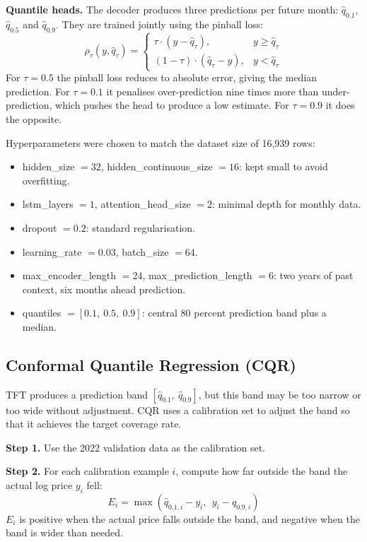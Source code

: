 \documentclass[conference,twoside]{IEEEtran}
\begin{document}
\textbf{Quantile heads.} The decoder produces three predictions per future month: $\hat{q}_{0.1}$, $\hat{q}_{0.5}$ and $\hat{q}_{0.9}$. They are trained jointly using the pinball loss:
\begin{equation}
\rho_{\tau}(y, \hat{q}_\tau) =
\begin{cases}
\tau \cdot (y - \hat{q}_\tau), & y \geq \hat{q}_\tau \\
(1-\tau) \cdot (\hat{q}_\tau - y), & y < \hat{q}_\tau
\end{cases}
\label{eq:pinball}
\end{equation}
For $\tau = 0.5$ the pinball loss reduces to absolute error, giving the median prediction. For $\tau = 0.1$ it penalises over-prediction nine times more than under-prediction, which pushes the head to produce a low estimate. For $\tau = 0.9$ it does the opposite.

Hyperparameters were chosen to match the dataset size of 16{,}939 rows:
\begin{itemize}
    \item hidden\_size $= 32$, hidden\_continuous\_size $= 16$: kept small to avoid overfitting.
    \item lstm\_layers $= 1$, attention\_head\_size $= 2$: minimal depth for monthly data.
    \item dropout $= 0.2$: standard regularisation.
    \item learning\_rate $= 0.03$, batch\_size $= 64$.
    \item max\_encoder\_length $= 24$, max\_prediction\_length $= 6$: two years of past context, six months ahead prediction.
    \item quantiles $= [0.1,\ 0.5,\ 0.9]$: central 80 percent prediction band plus a median.
\end{itemize}

\subsection{Conformal Quantile Regression (CQR)}
\label{sec:cqr}
TFT produces a prediction band $[\hat{q}_{0.1},\ \hat{q}_{0.9}]$, but this band may be too narrow or too wide without adjustment. CQR \cite{romano2019cqr} uses a calibration set to adjust the band so that it achieves the target coverage rate.

\textbf{Step 1.} Use the 2022 validation data as the calibration set.

\textbf{Step 2.} For each calibration example $i$, compute how far outside the band the actual log price $y_i$ fell:
\begin{equation}
E_i = \max\!\left(\hat{q}_{0.1,i} - y_i,\ \ y_i - \hat{q}_{0.9,i}\right)
\label{eq:conformity}
\end{equation}
$E_i$ is positive when the actual price falls outside the band, and negative when the band is wider than needed.
\end{document}
